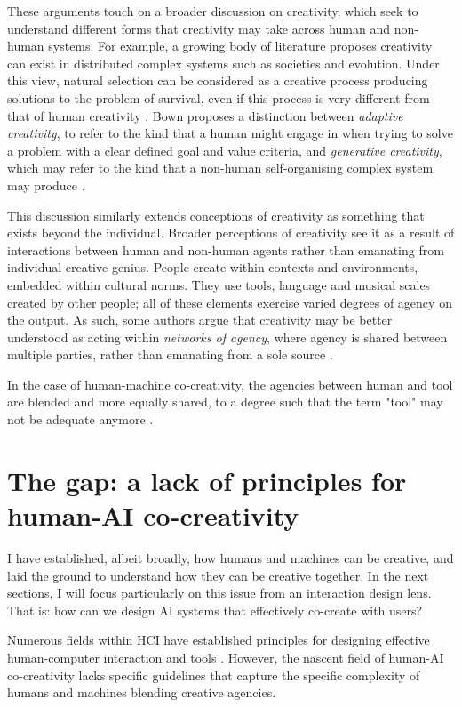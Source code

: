 These arguments touch on a broader discussion on creativity, which seek to understand different forms that creativity may take across human and non-human systems. For example, a growing body of literature proposes creativity can exist in distributed complex systems such as societies and evolution. Under this view, natural selection can be considered as a creative process producing solutions to the problem of survival, even if this process is very different from that of human creativity \cite{Wagner2015-oj}. Bown proposes a distinction between \textit{adaptive creativity}, to refer to the kind that a human might engage in when trying to solve a problem with a clear defined goal and value criteria, and \textit{generative creativity}, which may refer to the kind that a non-human self-organising complex system may produce \cite{Bown2012-gg}. 

This discussion similarly extends conceptions of creativity as something that exists beyond the individual. Broader perceptions of creativity see it as a result of interactions between human and non-human agents rather than emanating from individual creative genius. People create within contexts and environments, embedded within cultural norms. They use tools, language and musical scales created by other people; all of these elements exercise varied degrees of agency on the output. As such, some authors argue that creativity may be better understood as acting within \textit{networks of agency}, where agency is shared between multiple parties, rather than emanating from a sole source \cite{Brown2016-tc, Malafouris2008-xn}. 

In the case of human-machine co-creativity, the agencies between human and tool are blended and more equally shared, to a degree such that the term "tool" may not be adequate anymore \cite{Lawton2023-tb}. 

\section{The gap: a lack of principles for human-AI co-creativity}

I have established, albeit broadly, how humans and machines can be creative, and laid the ground to understand how they can be creative together. In the next sections, I will focus particularly on this issue from an interaction design lens. That is: how can we design AI systems that effectively co-create with users?

Numerous fields within HCI have established principles for designing effective human-computer interaction and tools \cite{Nielsen1994-df, Amershi2019-vy, Shneiderman2020-je, Wright2020-nt, Bengler2012-jf, Resnick2005-fs}. However, the nascent field of human-AI co-creativity lacks specific guidelines that capture the specific complexity of humans and machines blending creative agencies. 

